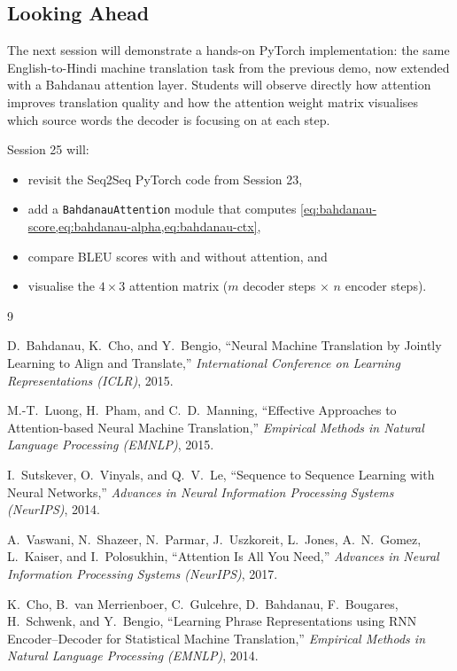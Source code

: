 \documentclass[12pt,a4paper]{article}
\begin{document}
\subsection*{Looking Ahead}

The next session will demonstrate a hands-on PyTorch implementation:
the same English-to-Hindi machine translation task from the previous
demo, now extended with a Bahdanau attention layer.  Students will
observe directly how attention improves translation quality and how
the attention weight matrix visualises which source words the decoder
is focusing on at each step.

\begin{example}[title=What to Expect in Session 25]
  Session 25 will:
  \begin{itemize}
    \item revisit the Seq2Seq PyTorch code from Session 23,
    \item add a \texttt{BahdanauAttention} module that computes
          \cref{eq:bahdanau-score,eq:bahdanau-alpha,eq:bahdanau-ctx},
    \item compare BLEU scores with and without attention, and
    \item visualise the $4 \times 3$ attention matrix
          ($m$ decoder steps $\times$ $n$ encoder steps).
  \end{itemize}
\end{example}

\newpage
\begin{thebibliography}{9}

  D.\ Bahdanau, K.\ Cho, and Y.\ Bengio,
  ``Neural Machine Translation by Jointly Learning to Align and
    Translate,''
  \textit{International Conference on Learning Representations (ICLR)},
  2015.

  M.-T.\ Luong, H.\ Pham, and C.\ D.\ Manning,
  ``Effective Approaches to Attention-based Neural Machine
    Translation,''
  \textit{Empirical Methods in Natural Language Processing (EMNLP)},
  2015.

  I.\ Sutskever, O.\ Vinyals, and Q.\ V.\ Le,
  ``Sequence to Sequence Learning with Neural Networks,''
  \textit{Advances in Neural Information Processing Systems (NeurIPS)},
  2014.

  A.\ Vaswani, N.\ Shazeer, N.\ Parmar, J.\ Uszkoreit, L.\ Jones,
  A.\ N.\ Gomez, L.\ Kaiser, and I.\ Polosukhin,
  ``Attention Is All You Need,''
  \textit{Advances in Neural Information Processing Systems (NeurIPS)},
  2017.

  K.\ Cho, B.\ van Merrienboer, C.\ Gulcehre, D.\ Bahdanau,
  F.\ Bougares, H.\ Schwenk, and Y.\ Bengio,
  ``Learning Phrase Representations using RNN Encoder--Decoder for
    Statistical Machine Translation,''
  \textit{Empirical Methods in Natural Language Processing (EMNLP)},
  2014.

\end{thebibliography}

\clearpage
\end{document}
